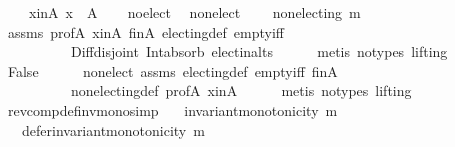 \begin{isabellebody}
\ \ \ \ x{\isacharunderscore}{\kern0pt}in{\isacharunderscore}{\kern0pt}A{\isacharcolon}{\kern0pt}\ {\isachardoublequoteopen}x\ {\isasymin}\ A{\isachardoublequoteclose}\isanewline
\ \ \isamarkupfalse%
\ no{\isacharunderscore}{\kern0pt}elect\ \isamarkupfalse%
\ non{\isacharunderscore}{\kern0pt}elect{\isacharcolon}{\kern0pt}\isanewline
\ \ \ \ {\isachardoublequoteopen}non{\isacharunderscore}{\kern0pt}electing\ m{\isachardoublequoteclose}\isanewline
\ \ \ \ \isamarkupfalse%
\ assms\ prof{\isacharunderscore}{\kern0pt}A\ x{\isacharunderscore}{\kern0pt}in{\isacharunderscore}{\kern0pt}A\ fin{\isacharunderscore}{\kern0pt}A\ electing{\isacharunderscore}{\kern0pt}def\ empty{\isacharunderscore}{\kern0pt}iff\isanewline
\ \ \ \ \ \ \ \ \ \ Diff{\isacharunderscore}{\kern0pt}disjoint\ Int{\isacharunderscore}{\kern0pt}absorb{}\ elect{\isacharunderscore}{\kern0pt}in{\isacharunderscore}{\kern0pt}alts\isanewline
\ \ \ \ \isamarkupfalse%
\ {\isacharparenleft}{\kern0pt}metis\ {\isacharparenleft}{\kern0pt}no{\isacharunderscore}{\kern0pt}types{\isacharcomma}{\kern0pt}\ lifting{\isacharparenright}{\kern0pt}{\isacharparenright}{\kern0pt}\isanewline
\ \ \isamarkupfalse%
\ {\isachardoublequoteopen}False{\isachardoublequoteclose}\isanewline
\ \ \ \ \isamarkupfalse%
\ non{\isacharunderscore}{\kern0pt}elect\ assms\ electing{\isacharunderscore}{\kern0pt}def\ empty{\isacharunderscore}{\kern0pt}iff\ fin{\isacharunderscore}{\kern0pt}A\isanewline
\ \ \ \ \ \ \ \ \ \ non{\isacharunderscore}{\kern0pt}electing{\isacharunderscore}{\kern0pt}def\ prof{\isacharunderscore}{\kern0pt}A\ x{\isacharunderscore}{\kern0pt}in{\isacharunderscore}{\kern0pt}A\isanewline
\ \ \ \ \isamarkupfalse%
\ {\isacharparenleft}{\kern0pt}metis\ {\isacharparenleft}{\kern0pt}no{\isacharunderscore}{\kern0pt}types{\isacharcomma}{\kern0pt}\ lifting{\isacharparenright}{\kern0pt}{\isacharparenright}{\kern0pt}\isanewline
{}\isamarkupfalse%
%
\endisatagproof
{\isafoldproof}%
%
\isadelimproof
\isanewline
%
\endisadelimproof
\isanewline
\isanewline
{}\isamarkupfalse%
\ rev{\isacharunderscore}{\kern0pt}comp{\isacharunderscore}{\kern0pt}def{\isacharunderscore}{\kern0pt}inv{\isacharunderscore}{\kern0pt}mono{\isacharbrackleft}{\kern0pt}simp{\isacharbrackright}{\kern0pt}{\isacharcolon}{\kern0pt}\isanewline
\ \ \ {\isachardoublequoteopen}invariant{\isacharunderscore}{\kern0pt}monotonicity\ m{\isachardoublequoteclose}\isanewline
\ \ \ {\isachardoublequoteopen}defer{\isacharunderscore}{\kern0pt}invariant{\isacharunderscore}{\kern0pt}monotonicity\ {\isacharparenleft}{\kern0pt}m{\isasymdown}{\isacharparenright}{\kern0pt}{\isachardoublequoteclose}\isanewline

\end{isabellebody}
